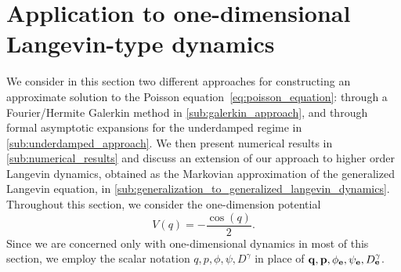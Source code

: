 \documentclass[11pt,a4paper]{article}
\begin{document}
\section{Application to one-dimensional Langevin-type dynamics}%
\label{sec:application_to_one_dimensional_langevin_type_dynamics}

We consider in this section two different approaches for constructing an approximate solution to the Poisson equation~\eqref{eq:poisson_equation}:
through a Fourier/Hermite Galerkin method in \cref{sub:galerkin_approach},
and through formal asymptotic expansions for the underdamped regime in \cref{sub:underdamped_approach}.
We then present numerical results in \cref{sub:numerical_results}
and discuss an extension of our approach to higher order Langevin dynamics, obtained as the Markovian approximation of the generalized Langevin equation, in \cref{sub:generalization_to_generalized_langevin_dynamics}.
Throughout this section, we consider the one-dimension potential
\[
    V(q) = - \frac{\cos(q)}{2}.
\]
Since we are concerned only with one-dimensional dynamics in most of this section,
we employ the scalar notation $q, p, \phi, \psi, D^{\gamma}$ in place of $\boldsymbol{\mathbf q}, \boldsymbol{\mathbf p}, \phi_{\boldsymbol{\mathbf e}}, \psi_{\boldsymbol{\mathbf e}}, D^{\gamma}_{\boldsymbol{\mathbf e}}$.
\end{document}
